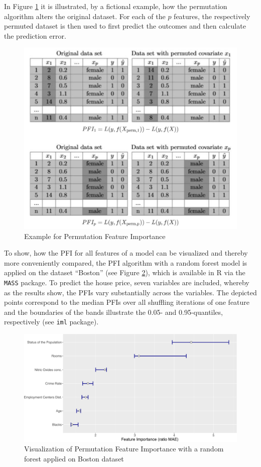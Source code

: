 \documentclass[
]{krantz}
\begin{document}
In Figure \ref{fig:PFI} it is illustrated, by a fictional example, how the permutation algorithm alters the original dataset. For each of the \(p\) features, the respectively permuted dataset is then used to first predict the outcomes and then calculate the prediction error.

\begin{figure}

{\centering \includegraphics[width=0.65\linewidth]{images/Permutation_All} 

}

\caption{Example for Permutation Feature Importance}\label{fig:PFI}
\end{figure}

To show, how the PFI for all features of a model can be visualized and thereby more conveniently compared, the PFI algorithm with a random forest model is applied on the dataset ``Boston'' (see Figure \ref{fig:plot}), which is available in R via the \texttt{MASS} package. To predict the house price, seven variables are included, whereby as the results show, the PFIs vary substantially across the variables. The depicted points correspond to the median PFIs over all shuffling iterations of one feature and the boundaries of the bands illustrate the 0.05- and 0.95-quantiles, respectively (see \texttt{iml} package).

\begin{figure}
\centering
\includegraphics{book_files/figure-latex/plot-1.pdf}
\caption{\label{fig:plot}Visualization of Permutation Feature Importance with a random forest applied on Boston dataset}
\end{figure}
\end{document}
